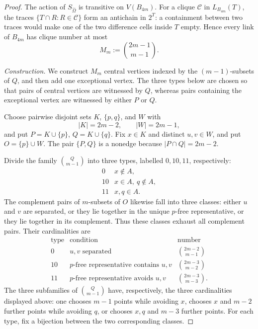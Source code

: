 \documentclass[11pt]{article}
\begin{document}
\begin{proof}
The action of \(S_{\widehat\Omega}\) is transitive on \(V(B_{4m})\).  For a
clique \(\mathcal C\) in \(L_{B_{4m}}(T)\), the traces
\(\{T\cap R:R\in\mathcal C\}\) form an antichain in \(2^T\): a containment
between two traces would make one of the two difference cells inside \(T\)
empty.  Hence every link of \(B_{4m}\) has clique number at most
\[
M_m:=\binom{2m-1}{m-1}.
\]

\emph{Construction.}
We construct \(M_m\) central vertices indexed by the \((m-1)\)-subsets of
\(Q\), and then add one exceptional vertex.  The three types below are
chosen so that pairs of central vertices are witnessed by \(Q\), whereas
pairs containing the exceptional vertex are witnessed by either \(P\) or
\(Q\).

Choose pairwise disjoint sets \(K\), \(\{p,q\}\), and \(W\) with
\[
|K|=2m-2,\qquad |W|=2m-1,
\]
and put \(P=K\cup\{p\}\), \(Q=K\cup\{q\}\).  Fix
\(x\in K\) and distinct \(u,v\in W\), and put \(O=\{p\}\cup W\).
The pair \(\{P,Q\}\) is a nonedge because \(|P\cap Q|=2m-2\).

Divide the family \(\binom{Q}{m-1}\) into three types, labelled
\(0,10,11\), respectively:
\[
\begin{array}{c|l}
0&x\notin A,\\
10&x\in A,\ q\notin A,\\
11&x,q\in A.
\end{array}
\]
The complement pairs of \(m\)-subsets of \(O\) likewise fall into three
classes: either \(u\) and \(v\) are separated, or they lie together in the
unique \(p\)-free representative, or they lie together in its complement.  Thus
these classes exhaust all complement pairs.  Their cardinalities are
\[
\begin{array}{c|c|c}
\text{type}&\text{condition}&\text{number}\\ \hline
0&u,v\text{ separated}&\binom{2m-2}{m-1}\\
10&\text{\(p\)-free representative contains }u,v&
\binom{2m-3}{m-2}\\
11&\text{\(p\)-free representative avoids }u,v&
\binom{2m-3}{m-3}.
\end{array}
\]
The three subfamilies of \(\binom{Q}{m-1}\) have, respectively, the three
cardinalities displayed above: one chooses \(m-1\) points while avoiding
\(x\), chooses \(x\) and \(m-2\) further points while avoiding \(q\), or
chooses \(x,q\) and \(m-3\) further points.  For each type, fix a bijection
between the two corresponding classes.


\end{proof}
\end{document}
